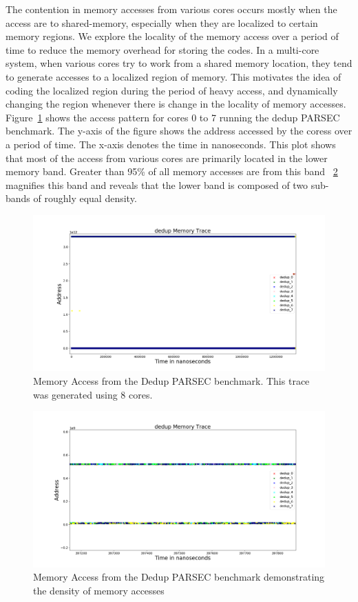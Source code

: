 The contention in memory accesses from various cores occurs mostly when the 
access are to shared-memory, especially when they are localized to certain 
memory regions. We explore the locality of the memory access over a period of 
time to reduce the memory overhead for storing the codes. In a multi-core 
system, when various cores try to work from a shared memory location, they tend 
to generate accesses to a localized region of memory. This motivates the idea of 
coding the localized region during the period of heavy access, and dynamically 
changing the region whenever there is change in the locality of memory accesses.
Figure~\ref{fig:dedup_whole} shows the access pattern for cores 0 to 7 running the dedup PARSEC benchmark.  
The y-axis of the figure shows the address accessed by the coress over a 
period of time. The x-axis denotes the time in nanoseconds. This plot shows that 
most of the access from various cores are primarily located in the lower memory band. Greater than 95\% of all memory accesses are from this band ~\ref{fig:dedup_dense} magnifies this band and reveals that the lower band is composed of two sub-bands of roughly equal density.

\begin{figure}[htbp]
		\includegraphics[width=\linewidth]{fig/dedup_whole.png}
		\caption{Memory Access from the Dedup PARSEC benchmark. This trace was generated using 8 cores.}
		\label{fig:dedup_whole}
\end{figure}

\begin{figure}[htbp]
		\includegraphics[width=\linewidth]{fig/dedup_dense.png}
		\caption{Memory Access from the Dedup PARSEC benchmark demonstrating the density of memory accesses}
		\label{fig:dedup_dense}
\end{figure}

